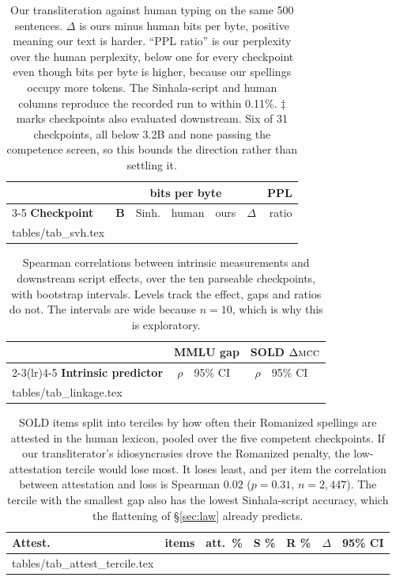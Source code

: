 \documentclass[11pt]{article}
\makeatletter
\newcommand{\mcc}{\textsc{mcc}}
\newcommand{\rows}[1]{\@@input #1 }
\makeatother
\begin{document}
\begin{table}[t]
\centering\scriptsize
\setlength{\tabcolsep}{2.6pt}
\begin{tabular}{@{}lr rrr rr@{}}
\toprule
& & \multicolumn{3}{c}{\textbf{bits per byte}} & & \textbf{PPL} \\
\cmidrule(lr){3-5}
\textbf{Checkpoint} & \textbf{B} & Sinh. & human & ours
& \boldmath$\Delta$ & ratio \\
\midrule
\rows{tables/tab_svh.tex}
\bottomrule
\end{tabular}
\caption{Our transliteration against human typing on the same 500 sentences.
$\Delta$ is ours minus human bits per byte, positive meaning our text is harder.
``PPL ratio'' is our perplexity over the human perplexity, below one for every
checkpoint even though bits per byte is higher, because our spellings occupy more
tokens. The Sinhala-script and human columns
reproduce the recorded run to within 0.11\%. $\ddagger$ marks checkpoints also evaluated
downstream. Six of 31 checkpoints, all below 3.2B and none passing the competence
screen, so this bounds the direction rather than settling it.}
\label{tab:svh}
\end{table}

\begin{table}[t]
\centering\scriptsize
\setlength{\tabcolsep}{2pt}
\begin{tabular}{@{}l r@{~}l r@{~}l@{}}
\toprule
& \multicolumn{2}{c}{\textbf{MMLU gap}} & \multicolumn{2}{c}{\textbf{SOLD} $\Delta\mcc$} \\
\cmidrule(lr){2-3}\cmidrule(lr){4-5}
\textbf{Intrinsic predictor} & $\rho$ & 95\% CI & $\rho$ & 95\% CI \\
\midrule
\rows{tables/tab_linkage.tex}
\bottomrule
\end{tabular}
\caption{Spearman correlations between intrinsic measurements and downstream
script effects, over the ten parseable checkpoints, with bootstrap intervals.
Levels track the effect, gaps and ratios do not. The intervals are wide because
$n = 10$, which is why this is exploratory.}
\label{tab:linkage}
\end{table}

\begin{table}[t]
\centering\small
\setlength{\tabcolsep}{2.8pt}
\begin{tabular}{@{}lrr rrr l@{}}
\toprule
\textbf{Attest.} & \textbf{items} & \textbf{att.\ \%}
& \textbf{S \%} & \textbf{R \%} & \boldmath$\Delta$ & \textbf{95\% CI} \\
\midrule
\rows{tables/tab_attest_tercile.tex}
\bottomrule
\end{tabular}
\caption{SOLD items split into terciles by how often their Romanized spellings are
attested in the human lexicon, pooled over the five competent checkpoints. If our
transliterator's idiosyncrasies drove the Romanized penalty, the low-attestation
tercile would lose most. It loses least, and per item the correlation between
attestation and loss is Spearman $0.02$ ($p = 0.31$, $n = 2{,}447$). The tercile
with the smallest gap also has the lowest Sinhala-script accuracy, which the
flattening of \S\ref{sec:law} already predicts.}
\label{tab:attesttercile}
\end{table}
\end{document}
